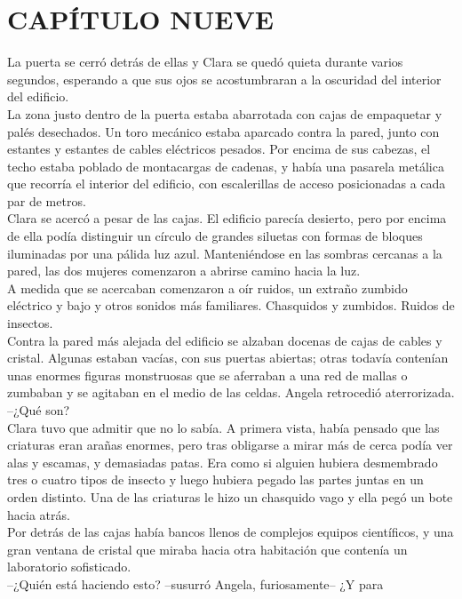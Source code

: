 \chapter*{CAPÍTULO NUEVE}
La puerta se cerró detrás de ellas y Clara se quedó quieta durante
varios segundos, esperando a que sus ojos se acostumbraran a la
oscuridad del interior del edificio.\\
La zona justo dentro de la puerta estaba abarrotada con cajas de
empaquetar y palés desechados. Un toro mecánico estaba aparcado contra
la pared, junto con estantes y estantes de cables eléctricos pesados.
Por encima de sus cabezas, el techo estaba poblado de montacargas de
cadenas, y había una pasarela metálica que recorría el interior del
edificio, con escalerillas de acceso posicionadas a cada par de
metros.\\
Clara se acercó a pesar de las cajas. El edificio parecía desierto, pero
por encima de ella podía distinguir un círculo de grandes siluetas con
formas de bloques iluminadas por una pálida luz azul. Manteniéndose en
las sombras cercanas a la pared, las dos mujeres comenzaron a abrirse
camino hacia la luz.\\
A medida que se acercaban comenzaron a oír ruidos, un extraño zumbido
eléctrico y bajo y otros sonidos más familiares. Chasquidos y zumbidos.
Ruidos de insectos.\\
Contra la pared más alejada del edificio se alzaban docenas de cajas de
cables y cristal. Algunas estaban vacías, con sus puertas abiertas;
otras todavía contenían unas enormes figuras monstruosas que se
aferraban a una red de mallas o zumbaban y se agitaban en el medio de
las celdas. Angela retrocedió aterrorizada.\\
--¿Qué son?\\
Clara tuvo que admitir que no lo sabía. A primera vista, había pensado
que las criaturas eran arañas enormes, pero tras obligarse a mirar más
de cerca podía ver alas y escamas, y demasiadas patas. Era como si
alguien hubiera desmembrado tres o cuatro tipos de insecto y luego
hubiera pegado las partes juntas en un orden distinto. Una de las
criaturas le hizo un chasquido vago y ella pegó un bote hacia atrás.\\
Por detrás de las cajas había bancos llenos de complejos equipos
científicos, y una gran ventana de cristal que miraba hacia otra
habitación que contenía un laboratorio sofisticado.\\
--¿Quién está haciendo esto? --susurró Angela, furiosamente-- ¿Y para
